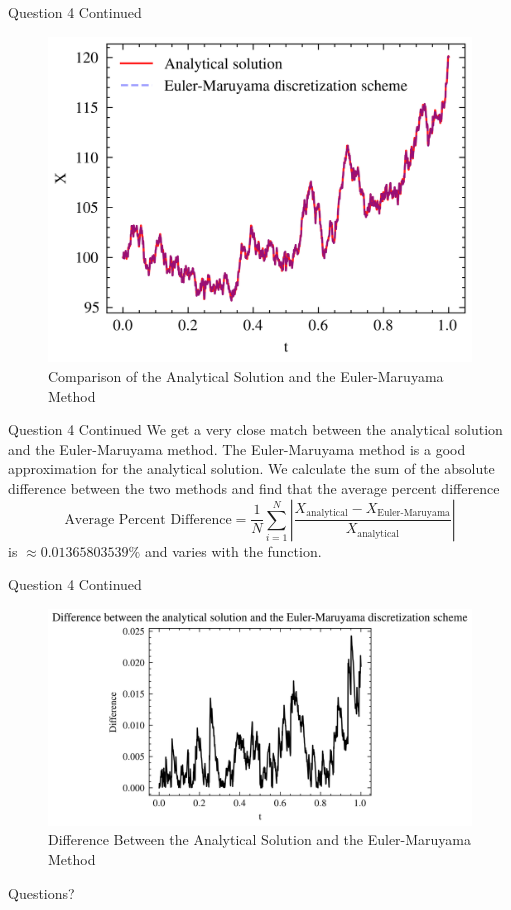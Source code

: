 \documentclass[compress,12pt]{beamer}
\begin{document}
\begin{frame}{Question 4 Continued}
    \begin{figure}
        \centering
        \includegraphics{imgs/eulermaruyama.png}
        \caption{Comparison of the Analytical Solution and the Euler-Maruyama Method}
    \end{figure}
\end{frame}

\begin{frame}{Question 4 Continued}
    We get a very close match between the analytical solution and the Euler-Maruyama method. The Euler-Maruyama method is a good approximation for the analytical solution. We calculate
    the sum of the absolute difference between the two methods and find that the average percent difference
    \begin{equation*}
        \text{Average Percent Difference} = \frac{1}{N} \sum_{i=1}^{N} \left| \frac{X_{\text{analytical}} - X_{\text{Euler-Maruyama}}}{X_{\text{analytical}}} \right|
    \end{equation*}
    is $\approx 0.01365803539\%$ and varies with the function.
\end{frame}

\begin{frame}{Question 4 Continued}
    \begin{figure}
        \centering
        \includegraphics{imgs/difference.png}
        \caption{Difference Between the Analytical Solution and the Euler-Maruyama Method}
    \end{figure}
\end{frame}

\End
\begin{frame}
      \centering
      Questions?
\end{frame}
\end{document}

